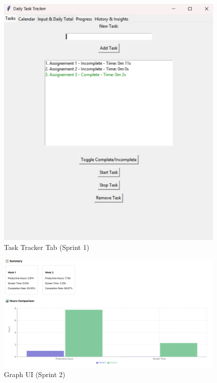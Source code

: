 \documentclass[12pt,a4paper]{article}
\begin{document}
\begin{figure}
    \centering
    \includegraphics[width=\linewidth]{Task Tracker Sprint 1.png}
    \caption{Task Tracker Tab (Sprint 1)}
    \label{fig:uml-diagram}
\end{figure}

\begin{figure}
    \centering
    \includegraphics[width=\linewidth]{Graph view (Sprint 2).png}
    \caption{Graph UI (Sprint 2)}
    \label{fig:uml-diagram}
\end{figure}
\end{document}
